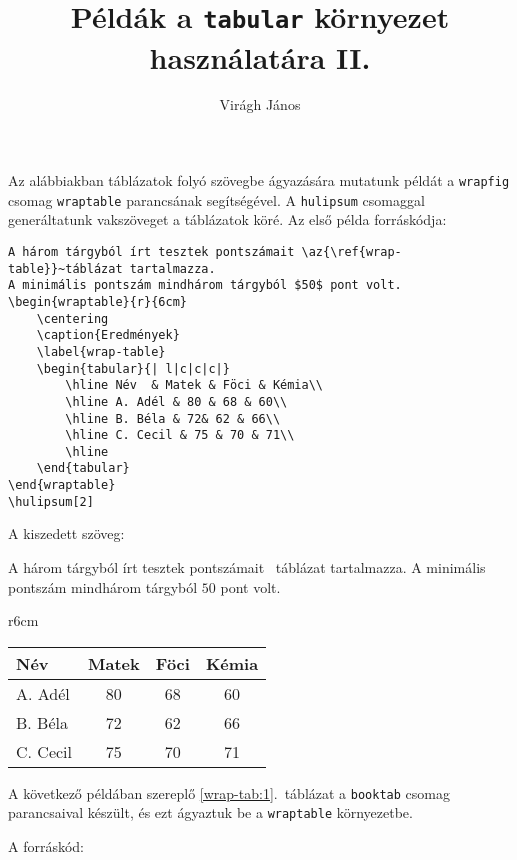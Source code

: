 \documentclass{article}
\author{Virágh János}
\title{Példák a \texttt{tabular} környezet használatára II.}
\begin{document}
\maketitle	

Az alábbiakban táblázatok folyó szövegbe ágyazására mutatunk példát a {\color{blue}\texttt{wrapfig}} csomag {\color{blue}\texttt{wraptable}} parancsának segítségével. A {\color{blue}\texttt{hulipsum}} csomaggal generáltatunk vakszöveget a táblázatok köré. Az első példa  forráskódja:
\begin{verbatim}
A három tárgyból írt tesztek pontszámait \az{\ref{wrap-table}}~táblázat tartalmazza.
A minimális pontszám mindhárom tárgyból $50$ pont volt.
\begin{wraptable}{r}{6cm}
	\centering
	\caption{Eredmények}
	\label{wrap-table}
	\begin{tabular}{| l|c|c|c|}
		\hline Név	& Matek & Föci & Kémia\\
		\hline A. Adél & 80 & 68 & 60\\
		\hline B. Béla & 72& 62 & 66\\
	    \hline C. Cecil & 75 & 70 & 71\\
		\hline
	\end{tabular}
\end{wraptable}
\hulipsum[2]
\end{verbatim}

A kiszedett szöveg:

A három tárgyból írt tesztek pontszámait \az{\ref{wrap-table}}~táblázat tartalmazza.
A minimális pontszám mindhárom tárgyból $50$ pont volt.
\begin{wraptable}{r}{6cm}
	\centering
	\caption{Eredmények}
	\label{wrap-table}
	\begin{tabular}{| l|c|c|c|}
		\hline Név	& Matek & Föci & Kémia\\
		\hline A. Adél & 80 & 68 & 60\\
		\hline B. Béla & 72& 62 & 66\\
		\hline C. Cecil & 75 & 70 & 71\\
		\hline
	\end{tabular}
\end{wraptable}
\hulipsum[1]

\pagebreak[4]

A következő példában szereplő  \ref{wrap-tab:1}.~táblázat  a {\color{blue}\texttt{booktab}} csomag parancsaival készült, és ezt ágyaztuk be a {\color{blue}\texttt{wraptable}} környezetbe.

A forráskód:
\end{document}
